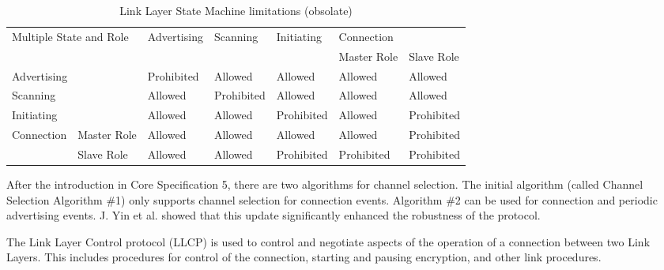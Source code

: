 \begin{table}[]
    \begin{tabular}{lllllll}
    \multicolumn{2}{l}{\multirow{2}{*}{Multiple State and Role}}  & \multirow{2}{*}{Advertising} & \multirow{2}{*}{Scanning} & \multirow{2}{*}{Initiating} & \multicolumn{2}{l}{Connection} \\
    \multicolumn{2}{l}{}                                          &                              &                           &                             & Master Role    & Slave Role    \\
    \multicolumn{2}{l}{Advertising}                               & Prohibited                   & Allowed                   & Allowed                     & Allowed        & Allowed       \\
    \multicolumn{2}{l}{Scanning}                                  & Allowed                      & Prohibited                & Allowed                     & Allowed        & Allowed       \\
    \multicolumn{2}{l}{Initiating}                                & Allowed                      & Allowed                   & Prohibited                  & Allowed        & Prohibited    \\
    \multicolumn{1}{c}{\multirow{2}{*}{Connection}} & Master Role & Allowed                      & Allowed                   & Allowed                     & Allowed        & Prohibited    \\
    \multicolumn{1}{c}{}                            & Slave Role  & Allowed                      & Allowed                   & Prohibited                  & Prohibited     & Prohibited   
    \end{tabular}
    \caption{Link Layer State Machine limitations (obsolate)}
    \label{tab:llstate_limit}
\end{table}

After the introduction in Core Specification 5, there are two algorithms for
channel selection.
The initial algorithm (called Channel Selection Algorithm \#1) only supports
channel selection for connection events.
Algorithm \#2 can be used for connection and periodic advertising events.
J. Yin et al. showed that this update significantly enhanced the robustness
of the protocol. \cite{Yin:19}

The Link Layer Control protocol (LLCP) is used to control and
negotiate aspects of the operation of a connection between two Link Layers.
This includes procedures for control of the connection, starting and pausing
encryption, and other link procedures. \cite{bt40}

